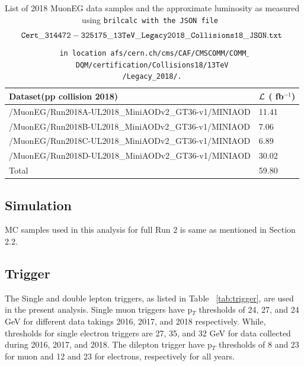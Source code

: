 \documentclass{cernatlasnote}
\newcommand{\fbinv}{\! fb$^{-1}$\xspace}
\begin{document}
\begin{table}[htbp]\label{tab:datasets2018}
\begin{center}
\begin{tabular}{|l|l|}
\hline
Dataset(pp collision 2018) & $\cal L$ (\fbinv) \\\hline
 /MuonEG/Run2018A-UL2018\_MiniAODv2\_GT36-v1/MINIAOD      &  11.41 \\
 /MuonEG/Run2018B-UL2018\_MiniAODv2\_GT36-v1/MINIAOD    & 7.06 \\
  /MuonEG/Run2018C-UL2018\_MiniAODv2\_GT36-v1/MINIAOD     & 6.89  \\
  /MuonEG/Run2018D-UL2018\_MiniAODv2\_GT36-v1/MINIAOD     & 30.02 \\ \hline
Total  & 59.80 \\ \hline
\end{tabular}
\end{center}
\caption{List of 2018 MuonEG data samples and the approximate luminosity as measured using \tt brilcalc with the JSON file $${\tt Cert\_314472-325175\_13TeV\_Legacy2018\_Collisions18\_JSON.txt}$$ in location afs/cern.ch/cms/CAF/CMSCOMM/COMM$\_$DQM/certification/Collisions18/13TeV \\/Legacy\_2018/.}\label{tab:datasets2018}
\end{table}
\subsection{Simulation}\label{sec:samples}
 MC samples used in this analysis for full Run 2 is same as mentioned in Section 2.2. 


\subsection{Trigger}
The Single and double lepton triggers, as listed in Table ~\ref{tab:trigger}, are used in the present analysis. Single muon triggers have p$_{T}$ thresholds of 24, 27, and 24 GeV for different data takings 2016, 2017, and 2018 respectively. While, thresholds for single electron triggers are 27, 35, and 32 GeV for data collected during 2016, 2017, and 2018. 
The dilepton trigger have p$_{T}$ thresholds of 8 and 23 for muon and 12 and 23 for electrons, respectively for all years.
\end{document}
